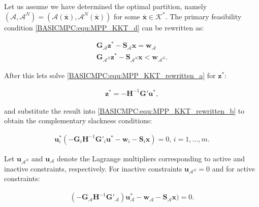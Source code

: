     Let us assume we have determined the optimal partition, namely $(\mathcal{A},\mathcal{A}^N)=(\mathcal{A}(\bar{\textbf{x}}),\mathcal{A}^N(\bar{\textbf{x}}))$ for some $\bar{\textbf{x}}\in\mathcal{K}^*$. The primary feasibility condition \ref{BASICMPC:equ:MPP_KKT_d} can be rewritten as:
    
    \begin{subequations}
    \label{BASICMPC:equ:MPP_KKT_rewritten}
        \begin{align}
         \textbf{G}_{\mathcal{A}}\textbf{z}^*-\textbf{S}_{\mathcal{A}}\textbf{x}=\textbf{w}_{\mathcal{A}} \label{BASICMPC:equ:MPP_KKT_rewritten_a}\\
         \textbf{G}_{\mathcal{A}^N}\textbf{z}^*-\textbf{S}_{\mathcal{A}^N}\textbf{x}<\textbf{w}_{\mathcal{A}^N}. \label{BASICMPC:equ:MPP_KKT_rewritten_b}
    \end{align}
    \end{subequations}
    
    After this lets solve \ref{BASICMPC:equ:MPP_KKT_rewritten_a} for $\textbf{z}^*$:
    
    \begin{equation}
    \begin{array}{rcl}
            \textbf{z}^*=-\textbf{H}^{-1}\textbf{G}'\textbf{u}^*,
        
        \end{array}
        \label{BASICMPC:equ:MPP_quadratic_solvedfor_z}
    \end{equation}
    
    and substitute the result into \ref{BASICMPC:equ:MPP_KKT_rewritten_b} to obtain the complementary slackness conditions:
    
    \begin{equation}
    \begin{array}{rcl}
            \textbf{u}^*_i(-\textbf{G}_i\textbf{H}^{-1}\textbf{G}'_i\textbf{u}^*-\textbf{w}_i-\textbf{S}_i\textbf{x})=0,\,i=1,\dots,m.
        \end{array}
        \label{BASICMPC:equ:MPP_quadratic_slackness}
    \end{equation}
    
    Let $\textbf{u}_{\mathcal{A}^N}$ and $\textbf{u}_{\mathcal{A}}$ denote the Lagrange multipliers corresponding to active and inactive constraints, respectively. For inactive constraints $\textbf{u}_{\mathcal{A}^N}=0$ and for active constraints: 
    
    \begin{equation}
    \begin{array}{rcl}
            (-\textbf{G}_{\mathcal{A}}\textbf{H}^{-1}\textbf{G}'_{\mathcal{A}})\textbf{u}^*_{\mathcal{A}}-\textbf{w}_{\mathcal{A}}-\textbf{S}_{\mathcal{A}}\textbf{x})=0.
        \end{array}
        \label{BASICMPC:equ:MPP_quadratic_activeconstr}
    \end{equation}
    
